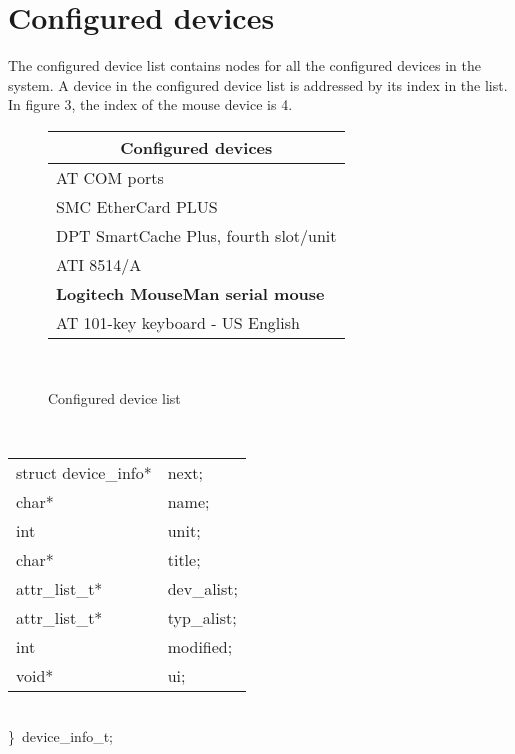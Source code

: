 \section{Configured devices}

The configured device list contains nodes for all the configured
devices in the system.  A device in the configured device list is
addressed by its index in the list. In figure 3, the index of
the mouse device is 4. \\

\begin{figure}
\begin{center}
\begin{tabular}{@{}|l|@{}} \hline
\multicolumn{1}{|c|}{Configured devices} \\ \hline
AT COM ports\\
SMC EtherCard PLUS \\
DPT SmartCache Plus, fourth slot/unit \\
ATI 8514/A \\
{\bf Logitech MouseMan serial mouse} \\
AT 101-key keyboard - US English \\ \hline
\end{tabular} \\
\caption{Configured device list}
\end{center}
\end{figure}

{\small \tt {} \\
\begin{tabular}{@{\hspace{1.2cm}}ll@{}}
struct device\_info* & next; \\
char* & name; \\
int & unit; \\
char* & title; \\
attr\_list\_t* & dev\_alist; \\
attr\_list\_t* & typ\_alist; \\
int & modified; \\
void* & ui;
\end{tabular} \\
\mbox{\} device\_info\_t;}} \\

{\small \tt {}} \\

